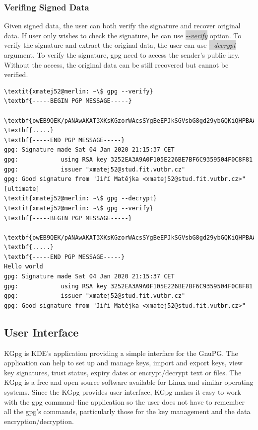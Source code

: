 \subsubsection*{Verifing Signed Data}
Given signed data, the user can both verify the signature and recover original data. If user only wishes to check the signature, he can use \colorbox{lightgray}{\textit{-{}-verify}} option. To verify the signature and extract the original data, the user can use \colorbox{lightgray}{\textit{-{}-decrypt}} argument. To verify the signature, gpg need to access the sender's public key. Without the access, the original data can be still recovered but cannot be verified.
\begin{Verbatim}[commandchars=\\\{\},codes={\catcode`$=3\catcode`_=8},samepage=false,frame=single]
\textit{xmatej52@merlin: ~\$ gpg --verify}
\textbf{-----BEGIN PGP MESSAGE-----}

\textbf{owEB9QEK/pANAwAKAT3XKsKGzorWAcsSYgBeEPJkSGVsbG8gd29ybGQKiQHPBAAB}
\textbf{.....}
\textbf{-----END PGP MESSAGE-----}
gpg: Signature made Sat 04 Jan 2020 21:15:37 CET
gpg:            using RSA key 3252EA3A9A0F105E226BE7BF6C9359504F0C8F81
gpg:            issuer "xmatej52@stud.fit.vutbr.cz"
gpg: Good signature from "Jiří Matějka <xmatej52@stud.fit.vutbr.cz>"
[ultimate]
\textit{xmatej52@merlin: ~\$ gpg --decrypt}
\textit{xmatej52@merlin: ~\$ gpg --verify}
\textbf{-----BEGIN PGP MESSAGE-----}

\textbf{owEB9QEK/pANAwAKAT3XKsKGzorWAcsSYgBeEPJkSGVsbG8gd29ybGQKiQHPBAAB}
\textbf{.....}
\textbf{-----END PGP MESSAGE-----}
Hello world
gpg: Signature made Sat 04 Jan 2020 21:15:37 CET
gpg:            using RSA key 3252EA3A9A0F105E226BE7BF6C9359504F0C8F81
gpg:            issuer "xmatej52@stud.fit.vutbr.cz"
gpg: Good signature from "Jiří Matějka <xmatej52@stud.fit.vutbr.cz>"
\end{Verbatim}
\subsection{User Interface}
KGpg is KDE's application providing a simple interface for the GnuPG. The application can help to set up and manage keys, import and export keys, view key signatures, trust status, expiry dates or encrypt/decrypt text or files. The KGpg is a free and open source software available for Linux and similar operating systems. Since the KGpg provides user interface, KGpg makes it easy to work with the gpg command--line application so the user does not have to remember all the gpg's commands, particularly those for the key management and the data encryption/decryption.

